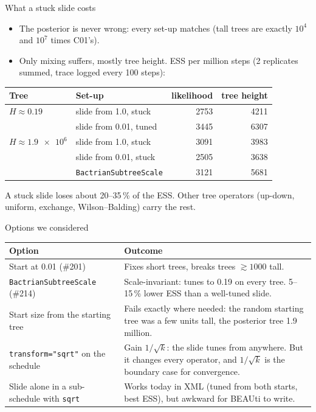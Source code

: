 \documentclass[aspectratio=169,11pt]{beamer}
\begin{document}
\begin{frame}{What a stuck slide costs}
  \begin{itemize}
    \item \alert{The posterior is never wrong}: every set-up matches (tall trees are exactly $10^4$ and
      $10^7$ times C01's).
    \item Only mixing suffers, mostly tree height. ESS per million steps (2 replicates summed, trace
      logged every 100 steps):
  \end{itemize}
  \centering\small
  \begin{tabular}{llrr}
    \toprule
    Tree & Set-up & likelihood & tree height \\
    \midrule
    $H \approx 0.19$ & slide from 1.0, stuck & 2753 & 4211 \\
                     & slide from 0.01, tuned & 3445 & 6307 \\
    \midrule
    $H \approx \num{1.9e6}$ & slide from 1.0, stuck & 3091 & 3983 \\
                     & slide from 0.01, stuck & 2505 & 3638 \\
                     & \texttt{BactrianSubtreeScale} & 3121 & 5681 \\
    \bottomrule
  \end{tabular}

  \vspace{0.5em}
  \raggedright
  \small A stuck slide loses about 20--35\,\% of the ESS. Other tree operators (up-down, uniform,
  exchange, Wilson--Balding) carry the rest.
\end{frame}

\begin{frame}{Options we considered}
  \small
  \begin{tabular}{p{}p{}}
    \toprule
    Option & Outcome \\
    \midrule
    Start at 0.01 (\#201) & Fixes short trees, breaks trees $\gtrsim 1000$ tall. \\
    \texttt{BactrianSubtreeScale} (\#214) & Scale-invariant: tunes to 0.19 on every tree.
      5--15\,\% lower ESS than a well-tuned slide. \\
    Start size from the starting tree & Fails exactly where needed: the random starting tree was a few
      units tall, the posterior tree 1.9 million. \\
    \texttt{transform="sqrt"} on the schedule & Gain $1/\sqrt{k}$: the slide tunes from anywhere.
      But it changes every operator, and $1/\sqrt{k}$ is the boundary case for convergence. \\
    Slide alone in a sub-schedule with \texttt{sqrt} & Works today in XML (tuned from both starts,
      best ESS), but awkward for BEAUti to write. \\
    \bottomrule
  \end{tabular}
\end{frame}
\end{document}
